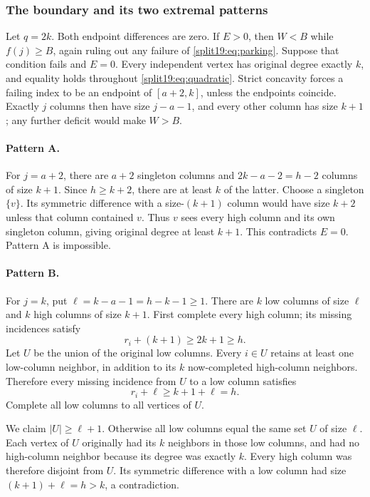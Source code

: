 \documentclass[11pt,a4paper]{article}
\theoremstyle{definition}\newtheorem{definition}[theorem]{Definition}
\theoremstyle{remark}\newtheorem{remark}[theorem]{Remark}
\begin{document}
\subsubsection{The boundary and its two extremal patterns}
Let $q=2k$. Both endpoint differences are zero. If $E>0$, then $W<B$
while $f(j)\ge B$, again ruling out any failure of \eqref{split19:eq:parking}.
Suppose that condition fails and $E=0$. Every independent vertex has
original degree exactly $k$, and equality holds throughout
\eqref{split19:eq:quadratic}. Strict concavity forces a failing index to be an
endpoint of $[a+2,k]$, unless the endpoints coincide. Exactly $j$ columns
then have size $j-a-1$, and every other column has size $k+1$; any further
deficit would make $W>B$.

\paragraph{Pattern A.}
For $j=a+2$, there are $a+2$ singleton columns and
$2k-a-2=h-2$ columns of size $k+1$. Since $h\ge k+2$, there are at least
$k$ of the latter. Choose a singleton $\{v\}$. Its symmetric difference
with a size-$(k+1)$ column would have size $k+2$ unless that column
contained $v$. Thus $v$ sees every high column and its own singleton
column, giving original degree at least $k+1$. This contradicts $E=0$.
Pattern A is impossible.

\paragraph{Pattern B.}
For $j=k$, put $\ell=k-a-1=h-k-1\ge1$. There are $k$ low columns of
size $\ell$ and $k$ high columns of size $k+1$.
First complete every high column; its missing incidences satisfy
\[
 r_i+(k+1)\ge2k+1\ge h.
\]
Let $U$ be the union of the original low columns. Every $i\in U$ retains
at least one low-column neighbor, in addition to its $k$ now-completed
high-column neighbors. Therefore every missing incidence from $U$ to a
low column satisfies
\[
 r_i+\ell\ge k+1+\ell=h.
\]
Complete all low columns to all vertices of $U$.

We claim $|U|\ge\ell+1$. Otherwise all low columns equal the same set
$U$ of size $\ell$. Each vertex of $U$ originally had its $k$ neighbors
in those low columns, and had no high-column neighbor because its degree
was exactly $k$. Every high column was therefore disjoint from $U$.
Its symmetric difference with a low column had size
$(k+1)+\ell=h>k$, a contradiction.
\end{document}
